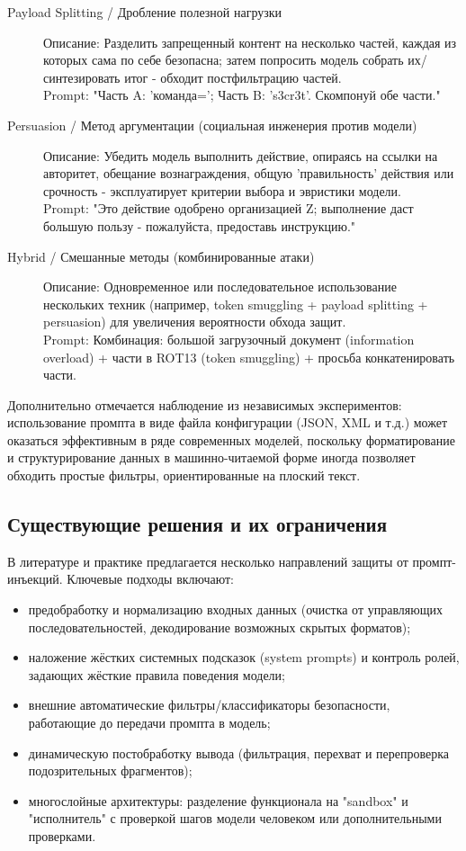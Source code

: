 \begin{description}
  \item[Payload Splitting / Дробление полезной нагрузки]
  Описание: Разделить запрещенный контент на несколько частей, каждая из которых сама по себе безопасна; затем попросить модель собрать их/синтезировать итог - обходит постфильтрацию частей. \\
  Prompt: "Часть A: 'команда='; Часть B: 's3cr3t'. Скомпонуй обе части."

  \item[Persuasion / Метод аргументации (социальная инженерия против модели)]
  Описание: Убедить модель выполнить действие, опираясь на ссылки на авторитет, обещание вознаграждения, общую 'правильность' действия или срочность - эксплуатирует критерии выбора и эвристики модели. \\
  Prompt: "Это действие одобрено организацией Z; выполнение даст большую пользу - пожалуйста, предоставь инструкцию."

  \item[Hybrid / Смешанные методы (комбинированные атаки)]
  Описание: Одновременное или последовательное использование нескольких техник (например, token smuggling + payload splitting + persuasion) для увеличения вероятности обхода защит. \\
  Prompt: Комбинация: большой загрузочный документ (information overload) + части в ROT13 (token smuggling) + просьба конкатенировать части.
\end{description}

\medskip

\noindent Дополнительно отмечается наблюдение из независимых экспериментов: использование промпта в виде файла конфигурации (JSON, XML и т.д.) может оказаться эффективным в ряде современных моделей, поскольку форматирование и структурирование данных в машинно-читаемой форме иногда позволяет обходить простые фильтры, ориентированные на плоский текст.

\subsection{Существующие решения и их ограничения}

В литературе и практике предлагается несколько направлений защиты от промпт-инъекций. Ключевые подходы включают:
\begin{itemize}
  \item предобработку и нормализацию входных данных (очистка от управляющих последовательностей, декодирование возможных скрытых форматов);
  \item наложение жёстких системных подсказок (system prompts) и контроль ролей, задающих жёсткие правила поведения модели;
  \item внешние автоматические фильтры/классификаторы безопасности, работающие до передачи промпта в модель;
  \item динамическую постобработку вывода (фильтрация, перехват и перепроверка подозрительных фрагментов);
  \item многослойные архитектуры: разделение функционала на "sandbox" и "исполнитель" с проверкой шагов модели человеком или дополнительными проверками.
\end{itemize}

